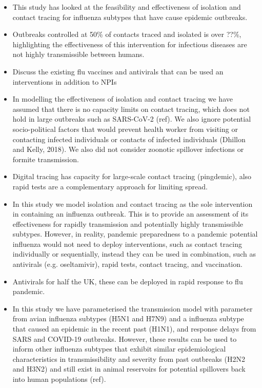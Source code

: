 \documentclass{article}
\begin{document}
\begin{itemize}
\item This study has looked at the feasibility and effectiveness of isolation and contact tracing for influenza subtypes that have cause epidemic outbreaks.
\item Outbreaks controlled at 50\% of contacts traced and isolated is over ??\%, highlighting the effectiveness of this intervention for infectious diseases are not highly transmissible between humans.
\item Discuss the existing flu vaccines and antivirals that can be used an interventions in addition to NPIs
\item In modelling the effectiveness of isolation and contact tracing we have assumed that there is no capacity limits on contact tracing, which does not hold in large outbreaks such as SARS-CoV-2 (ref). We also ignore potential socio-political factors that would prevent health worker from visiting or contacting infected individuals or contacts of infected individuals (Dhillon and Kelly, 2018). We also did not consider zoonotic spillover infections or formite transmission.
\item Digital tracing has capacity for large-scale contact tracing (pingdemic), also rapid tests are a complementary approach for limiting spread.
\item In this study we model isolation and contact tracing as the sole intervention in containing an influenza outbreak. This is to provide an assessment of its effectiveness for rapidly transmission and potentially highly transmissible subtypes. However, in reality, pandemic preparedness to a pandemic potential influenza would not need to deploy interventions, such as contact tracing individually or sequentially, instead they can be used in combination, such as antivirals (e.g. oseltamivir), rapid tests, contact tracing, and vaccination.
\item Antivirals for half the UK, these can be deployed in rapid response to flu pandemic.
\item In this study we have parameterised the transmission model with parameter from avian influenza subtypes (H5N1 and H7N9) and a influenza subtype that caused an epidemic in the recent past (H1N1), and response delays from SARS and COVID-19 outbreaks. However, these results can be used to inform other influenza subtypes that exhibit similar epidemiological characteristics in transmissibility and severity from past outbreaks (H2N2 and H3N2) and still exist in animal reservoirs for potential spillovers back into human populations (ref).

\end{itemize}
\end{document}
